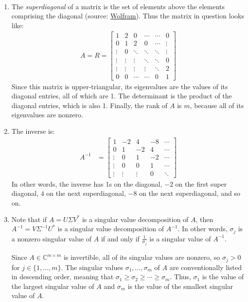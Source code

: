 \documentclass[12pt]{article}
\newenvironment{sol}[1][Solution]{\begin{trivlist}
		\item[\hskip \labelsep {\bfseries #1:}]}{\end{trivlist}}
\begin{document}
\begin{sol}
	\
	\begin{enumerate}[label=(\alph*)]
		\item The \emph{superdiagonal} of a matrix is the set of elements above the elements comprising the
		diagonal (source: \href{https://mathworld.wolfram.com/Superdiagonal.html}{Wolfram}). Thus
		the matrix in question looks like:
		\begin{align*}
			A=R=\begin{bmatrix}
				1 & 2 & 0 & \cdots & \cdots & 0\\
				0 & 1 & 2 & 0 & \cdots & \vdots\\
				\vdots & 0 & \ddots& \ddots & \ddots & \vdots\\
				\vdots& \vdots & \vdots & \ddots & \ddots& 0\\
				\vdots & \vdots & \vdots & \vdots& \ddots & 2\\
				0 & 0 & \cdots & \cdots & 0 & 1
			\end{bmatrix}
		\end{align*}
		Since this matrix is upper-triangular, its eigenvalues are the values of its diagonal entries,
		all of which are 1. The determinant is the product of the diagonal entries, which is also 1.
		Finally, the rank of $A$ is $m$, because all of its eigenvalues are nonzero.
		\item The inverse is:
		\begin{align*}
			A^{-1}&=\begin{bmatrix}
				1 & -2 & 4& -8 & \cdots\\
				0 & 1 & -2& 4 & \cdots \\
				\vdots & 0 & 1 & -2 &\cdots\\
				\vdots & 0 & 0 & 1 & \cdots\\
				\vdots & \vdots &\vdots & 0 & \ddots
			\end{bmatrix}
		\end{align*}
		In other words, the inverse has 1s on the diagonal, $-2$ on the first super diagonal, $4$ on the next
		superdiagonal, $-8$ on the next superdiagonal, and so on.
		\item Note that if $A=U\Sigma V^*$ is a singular value decomposition of $A$, then
		$A^{-1}=V\Sigma^{-1}U^*$ is a singular value decomposition of $A^{-1}$. In other words,
		$\sigma_j$ is a nonzero singular value of $A$ if and only if $\frac{1}{\sigma_j}$ is a singular value
		of $A^{-1}$.
		
		Since $A\in\mathbb{C}^{m\times m}$ is invertible, all of its singular values are nonzero, so
		$\sigma_j>0$ for $j\in\{1,\ldots,m\}$. The singular values $\sigma_1,\ldots,\sigma_m$ of $A$ are
		conventionally listed in descending order, meaning that $\sigma_1\geq \sigma_2\geq \cdots\geq\sigma_m$.
		Thus, $\sigma_1$ is the value of the largest singular value  of $A$ and $\sigma_m$ is the value
		of the smallest singular value of $A$.
		

\end{enumerate}
\end{sol}
\end{document}
